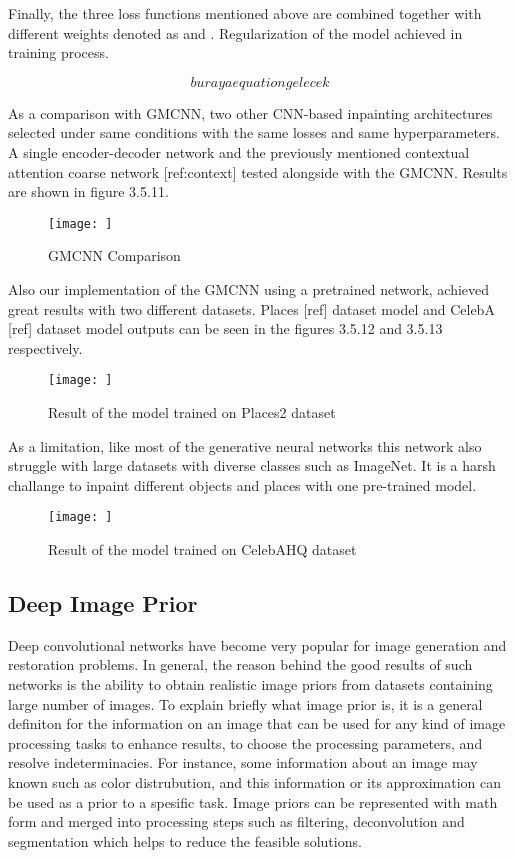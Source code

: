 Finally, the three loss functions mentioned above are combined together with different weights denoted as  and . Regularization of the model achieved in training process.

\begin{equation}
    buraya equation gelecek
\end{equation}

As a comparison with GMCNN, two other CNN-based inpainting architectures selected under same conditions with the same losses and same hyperparameters. A single encoder-decoder network and the previously mentioned contextual attention coarse network [ref:context] tested alongside with the GMCNN. Results are shown in figure 3.5.11.

\begin{figure}[h]
    \centering
    \texttt{[image: ]}
    \caption{GMCNN Comparison}
    \label{fig:my_label}
\end{figure}

Also our implementation of the GMCNN using a pretrained network, achieved great results with two different datasets. Places [ref] dataset model and CelebA [ref] dataset model outputs can be seen in the figures 3.5.12 and 3.5.13 respectively.

\begin{figure}[h]
    \centering
    \texttt{[image: ]}
    \caption{Result of the model trained on Places2 dataset}
    \label{fig:my_label}
\end{figure}

As a limitation, like most of the generative neural networks this network also struggle with large datasets with diverse classes such as ImageNet. It is a harsh challange to inpaint different objects and places with one pre-trained model.

\begin{figure}[h]
    \centering
    \texttt{[image: ]}
    \caption{Result of the model trained on CelebAHQ dataset}
    \label{fig:my_label}
\end{figure}

\subsection{Deep Image Prior}

Deep convolutional networks have become very popular for image generation and restoration problems. In general, the reason behind the good results of such networks is the ability to obtain realistic image priors from datasets containing large number of images. To explain briefly what image prior is, it is a general definiton for the information on an image that can be used for any kind of image processing tasks to enhance results, to choose the processing parameters, and resolve indeterminacies. For instance, some information about an image may known such as color distrubution, and this information or its approximation can be used as a prior to a spesific task. Image priors can be represented with math form and merged into processing steps such as filtering, deconvolution and segmentation which helps to reduce the feasible solutions.

